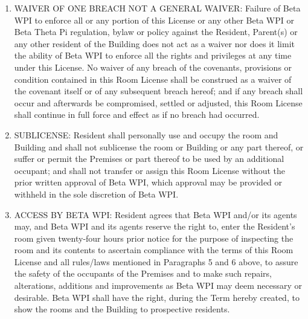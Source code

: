 \documentclass[legalpaper, 12pt]{article}
\begin{document}
\begin{enumerate}
        \item\label{itm:waiver} WAIVER OF ONE BREACH NOT A GENERAL WAIVER\@:
                Failure of Beta WPI to enforce all or any portion of this
                License or any other Beta WPI or Beta Theta Pi regulation,
                bylaw or policy against the Resident, Parent(s) or any other
                resident of the Building does not act as a waiver nor does it
                limit the ability of Beta WPI to enforce all the rights and
                privileges at any time under this License.  No waiver of any
                breach of the covenants, provisions or condition contained in
                this Room License shall be construed as a waiver of the
                covenant itself or of any subsequent breach hereof; and if any
                breach shall occur and afterwards be compromised, settled or
                adjusted, this Room License shall continue in full force and
                effect as if no breach had occurred.

        \item\label{itm:sublicense} SUBLICENSE\@: Resident shall personally use
                and occupy the room and Building and shall not sublicense the
                room or Building or any part thereof, or suffer or permit the
                Premises or part thereof to be used by an additional occupant;
                and shall not transfer or assign this Room License without the
                prior written approval of Beta WPI, which approval may be
                provided or withheld in the sole discretion of Beta WPI\@.

        \item\label{itm:access} ACCESS BY BETA WPI\@: Resident agrees that Beta
                WPI and/or its agents may, and Beta WPI and its agents reserve
                the right to, enter the Resident’s room given twenty-four hours
                prior notice for the purpose of inspecting the room and its
                contents to ascertain compliance with the terms of this Room
                License and all rules/laws mentioned in Paragraphs 5 and 6
                above, to assure the safety of the occupants of the Premises
                and to make such repairs, alterations, additions and
                improvements as Beta WPI may deem necessary or desirable.  Beta
                WPI shall have the right, during the Term hereby created, to
                show the rooms and the Building to prospective residents.


\end{enumerate}
\end{document}
